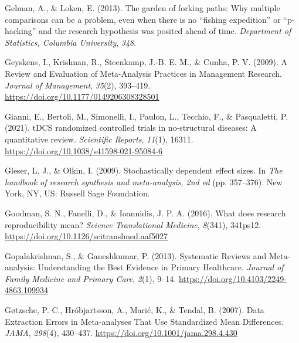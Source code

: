\documentclass[
  man,floatsintext]{apa6}
\newlength{\cslhangindent}
\newlength{\cslentryspacingunit} %
\newenvironment{CSLReferences}[2] %
 {%
  \setlength{\parindent}{0pt}
  \ifodd #1
  \let\oldpar\par
  \def\par{\hangindent=\cslhangindent\oldpar}
  \fi
  \setlength{\parskip}{#2\cslentryspacingunit}
 }%
 {}
\begin{document}
\begin{CSLReferences}{1}{0}
\leavevmode{}%
Gelman, A., \& Loken, E. (2013). The garden of forking paths: {Why} multiple comparisons can be a problem, even when there is no {``fishing expedition''} or {``p-hacking''} and the research hypothesis was posited ahead of time. \emph{Department of Statistics, Columbia University}, \emph{348}.

\leavevmode{}%
Geyskens, I., Krishnan, R., Steenkamp, J.-B. E. M., \& Cunha, P. V. (2009). A {Review} and {Evaluation} of {Meta-Analysis Practices} in {Management Research}. \emph{Journal of Management}, \emph{35}(2), 393--419. \url{https://doi.org/10.1177/0149206308328501}

\leavevmode{}%
Gianni, E., Bertoli, M., Simonelli, I., Paulon, L., Tecchio, F., \& Pasqualetti, P. (2021). {tDCS} randomized controlled trials in no-structural diseases: A quantitative review. \emph{Scientific Reports}, \emph{11}(1), 16311. \url{https://doi.org/10.1038/s41598-021-95084-6}

\leavevmode{}%
Gleser, L. J., \& Olkin, I. (2009). Stochastically dependent effect sizes. In \emph{The handbook of research synthesis and meta-analysis, 2nd ed} (pp. 357--376). {New York, NY, US}: {Russell Sage Foundation}.

\leavevmode{}%
Goodman, S. N., Fanelli, D., \& Ioannidis, J. P. A. (2016). What does research reproducibility mean? \emph{Science Translational Medicine}, \emph{8}(341), 341ps12. \url{https://doi.org/10.1126/scitranslmed.aaf5027}

\leavevmode{}%
Gopalakrishnan, S., \& Ganeshkumar, P. (2013). Systematic {Reviews} and {Meta-analysis}: {Understanding} the {Best Evidence} in {Primary Healthcare}. \emph{Journal of Family Medicine and Primary Care}, \emph{2}(1), 9--14. \url{https://doi.org/10.4103/2249-4863.109934}

\leavevmode{}%
Gøtzsche, P. C., Hróbjartsson, A., Marić, K., \& Tendal, B. (2007). Data {Extraction Errors} in {Meta-analyses That Use Standardized Mean Differences}. \emph{JAMA}, \emph{298}(4), 430--437. \url{https://doi.org/10.1001/jama.298.4.430}


\end{CSLReferences}
\end{document}
